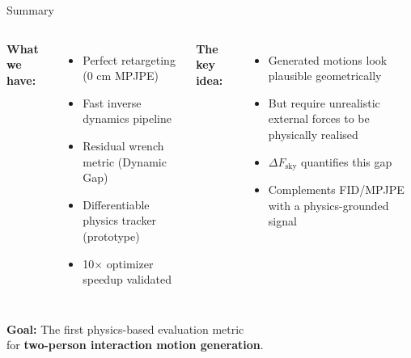 \documentclass[aspectratio=169, 10pt]{beamer}
\newcommand{\tick}{\textcolor{mlgreen}{\checkmark}}
\newcommand{\highlight}[1]{\textcolor{physblue}{\textbf{#1}}}
\begin{document}
\begin{frame}{Summary}
  \begin{columns}[T]
      \textbf{What we have:}
      \begin{itemize}
        \item[\tick] Perfect retargeting (0 cm MPJPE)
        \item[\tick] Fast inverse dynamics pipeline
        \item[\tick] Residual wrench metric (Dynamic Gap)
        \item[\tick] Differentiable physics tracker (prototype)
        \item[\tick] 10$\times$ optimizer speedup validated
      \end{itemize}

      \textbf{The key idea:}
      \begin{itemize}
        \item[$\rightarrow$] Generated motions look plausible geometrically
        \item[$\rightarrow$] But require unrealistic external forces to be physically realised
        \item[$\rightarrow$] $\Delta F_\text{sky}$ quantifies this gap
        \item[$\rightarrow$] Complements FID/MPJPE with a physics-grounded signal
      \end{itemize}
  \end{columns}

  \vspace{1em}
  \begin{center}
    \Large \highlight{Goal:} The first physics-based evaluation metric\\
    for \textbf{two-person interaction motion generation}.
  \end{center}
\end{frame}

\end{document}
